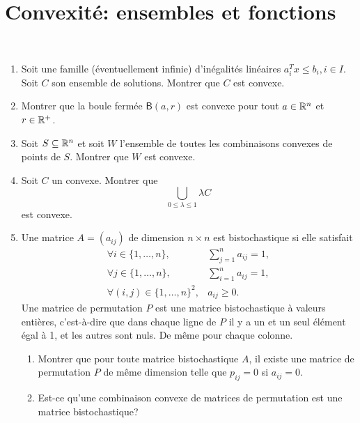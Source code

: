 \section{Convexité: ensembles et fonctions}\label{subsec:ss_1}

\begin{td-exo}[Convexité]\, %
	\begin{enumerate}
		\item Soit une famille (éventuellement infinie) d'inégalités linéaires
		\(a_i^T x \leq b_i,i\in I\). Soit \(C\) son ensemble de solutions.
		Montrer que \(C\) est convexe.

		\item Montrer que la boule fermée \(\mathsf{B}(a,r)\) est convexe
		pour tout \(a\in\mathbb{R}^n\) et \(r\in \mathbb{R}^+\).

		\item Soit \(S\subseteq\mathbb{R}^n\) et soit \(W\) l'ensemble de toutes les
		combinaisons convexes de points de \(S\). Montrer que \(W\) est convexe.

		\item Soit \(C\) un convexe. Montrer que 
		\begin{equation*}
			\bigcup_{0\leq\lambda\leq 1}\lambda C
		\end{equation*}
		est convexe.

		\item Une matrice \(A=(a_{ij})\) de dimension \(n\times n\) est bistochastique si 
		elle satisfait
		\begin{equation*}
			\begin{aligned}
				\forall i\in\{1,\ldots,n\}, & \sum_{j=1}^n a_{ij} = 1, \\
				\forall j\in\{1,\ldots,n\}, & \sum_{i=1}^n a_{ij} = 1, \\
				\forall (i,j)\in{\{1,\ldots,n\}}^2, & a_{ij}\geq 0.
			\end{aligned}
		\end{equation*}
		Une matrice de permutation \(P\) est une matrice bistochastique à valeurs 
		entières, c'est-à-dire que dans chaque ligne de \(P\) il y a un et un seul élément égal à 1,
		et les autres sont nuls. De même pour chaque colonne.
		\begin{enumerate}
			\item Montrer que pour toute matrice bistochastique \(A\), il existe
			une matrice de permutation \(P\) de même dimension telle que \(p_{ij}=0\)
			si \(a_{ij}=0\).

			\item Est-ce qu'une combinaison convexe de matrices de permutation est 
			une matrice bistochastique?


\end{enumerate}
\end{enumerate}
\end{td-exo}
